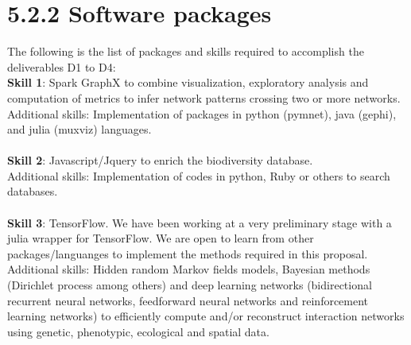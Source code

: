 \documentclass[11pt]{article}
\begin{document}
\section*{5.2.2 Software packages}

The following is the list of packages and skills required to
accomplish the deliverables D1 to D4:
\\
{\bf Skill 1}: Spark GraphX to combine visualization, exploratory
analysis and computation of
metrics to infer network patterns crossing two or more networks.\\
Additional skills: Implementation of packages in python (pymnet), java (gephi), and julia (muxviz) languages.\\
\\
{\bf Skill 2}: Javascript/Jquery to enrich the biodiversity database.\\
Additional skills: Implementation of codes in python, Ruby or others to search databases.\\
\\
{\bf Skill 3}: TensorFlow. We have been working at a very preliminary
stage with a julia wrapper for TensorFlow. We are open to learn
from other packages/languanges to implement the methods required in this proposal.\\
Additional skills: Hidden random Markov fields models, Bayesian
methods (Dirichlet process among others) and deep learning networks
(bidirectional recurrent neural networks, feedforward neural networks
and reinforcement learning networks) to efficiently compute and/or
reconstruct interaction networks using genetic, phenotypic, ecological
and spatial data.
\end{document}
